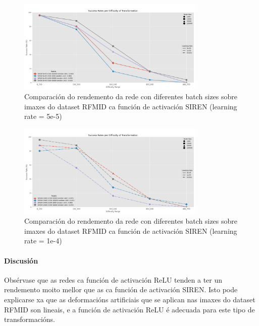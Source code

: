 \begin{figure}[ht] 
    \centering
    \includegraphics[width=0.8\textwidth]{imaxes/batchsize/experiment_plot_RFMID_SIREN_5e-05.png}
    \caption{Comparación do rendemento da rede con diferentes batch sizes sobre imaxes do dataset RFMID ca función de activación SIREN (learning rate = 5e-5)}
    \label{fig:batch_size_comparison_siren_5e-5}
\end{figure}

\begin{figure}[ht] 
    \centering
    \includegraphics[width=0.8\textwidth]{imaxes/batchsize/experiment_plot_RFMID_SIREN_0.0001.png}
    \caption{Comparación do rendemento da rede con diferentes batch sizes sobre imaxes do dataset RFMID ca función de activación SIREN (learning rate = 1e-4)}
    \label{fig:batch_size_comparison_siren_1e-4}
\end{figure}


\paragraph{Discusión}
\label{par:Discusión}

Obsérvase que as redes ca función de activación ReLU tenden a ter un rendemento moito mellor que as ca función de activación SIREN. Isto pode explicarse xa que as deformacións artificiais que se aplican nas imaxes do dataset RFMID son lineais, e a función de activación ReLU é adecuada para este tipo de transformacións.

